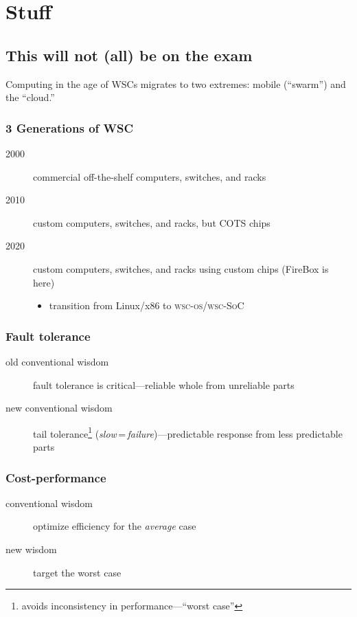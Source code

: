 \chapter{Stuff}
\section{This will not (all) be on the exam}
Computing in the age of WSCs migrates to two extremes: mobile (``swarm'') and the ``cloud.''
\subsection{3 Generations of WSC}
\begin{description}
	\item[2000] commercial off-the-shelf computers, switches, and racks
	\item[2010] custom computers, switches, and racks, but COTS chips
	\item[2020] custom computers, switches, and racks using custom chips (FireBox is here)
	\begin{itemize}
		\item transition from Linux/x86 to \textsc{wsc-os}/\textsc{wsc-SoC}
	\end{itemize}
\end{description}
\subsection{Fault tolerance}
\begin{description}
	\item[old conventional wisdom] fault tolerance is critical---reliable whole from unreliable parts
	\item[new conventional wisdom] tail tolerance\footnote{avoids inconsistency in performance---``worst case''} (\emph{slow}\,=\,\emph{failure})---predictable response from less predictable parts
\end{description}
\subsection{Cost-performance}
\begin{description}
	\item[conventional wisdom] optimize efficiency for the \emph{average} case
	\item[new wisdom] target the worst case
\end{description}
